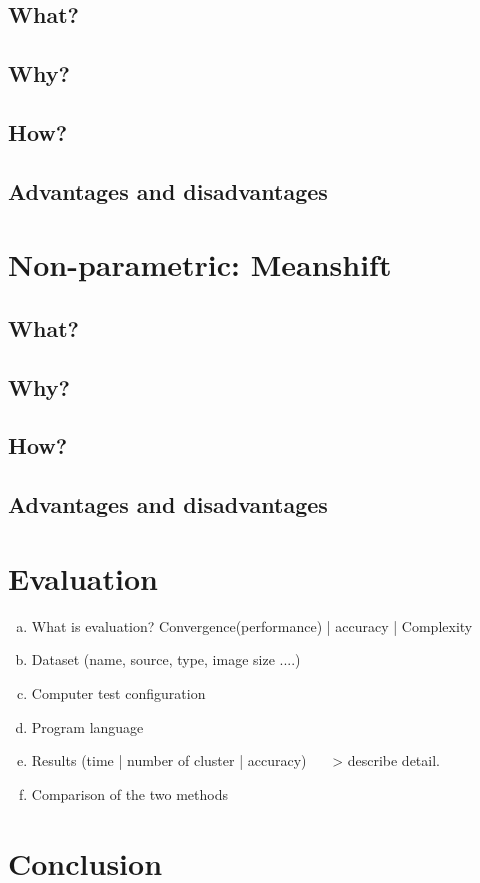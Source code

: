 \documentclass[13pt,a4paper]{report}
\begin{document}
\subsection{What?}

\subsection{Why?}

\subsection{How?}

\subsection{Advantages and disadvantages}


\section{Non-parametric: Meanshift}

\subsection{What?}

\subsection{Why?}

\subsection{How?}

\subsection{Advantages and disadvantages}

\section{Evaluation}

\begin{enumerate}[(a) ]
\item What is evaluation? Convergence(performance) | accuracy | Complexity
\item Dataset (name, source, type, image size ....)
\item Computer test configuration
\item Program language
\item Results (time | number of cluster | accuracy) ~~~> describe detail.
\item Comparison of the two methods
\end{enumerate}
	
	
\section{Conclusion}
\end{document}
